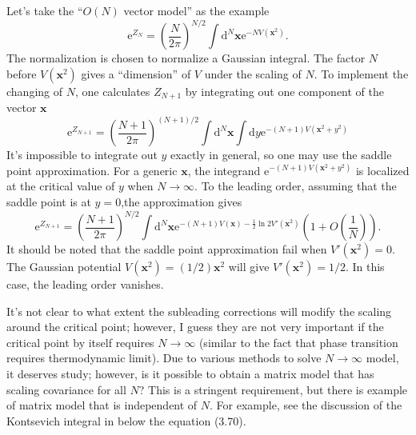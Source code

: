 Let's take the ``$O(N)$ vector model'' as the example
\begin{equation}
	\mathrm{e}^{Z_N} = \left(\frac{N}{2\pi}\right)^{N / 2} \int \mathrm{d}^N \mathbf{x} \mathrm{e}^{-N V(\mathbf{x}^2)}
.\end{equation}
The normalization is chosen to normalize a Gaussian integral.
The factor $N$ before $V(\mathbf{x}^2)$ gives a ``dimension'' of $V$ under the scaling of $N$.
To implement the changing of $N$, one calculates $Z_{N+1}$ by integrating out one component of the vector $\mathbf{x}$
\begin{equation}
	\mathrm{e}^{Z_{N+1}} = \left(\frac{N+1}{2\pi}\right)^{(N+1)/2} \int \mathrm{d}^N \mathbf{x} \int \mathrm{d} y \mathrm{e}^{-(N+1) V(\mathbf{x}^2 + y^2)}
\end{equation}
It's impossible to integrate out $y$ exactly in general,
so one may use the saddle point approximation.
For a generic $\mathbf{x}$, the integrand $\mathrm{e}^{-(N+1)V(\mathbf{x}^2 + y^2)}$ is localized at the critical value of $y$ when $N\to\infty$.
To the leading order, assuming that the saddle point is at $y=0$,the approximation gives \[
	\mathrm{e}^{Z_{N+1}} = \left(\frac{N+1}{2\pi}\right)^{N / 2} \int \mathrm{d}^N \mathbf{x} \mathrm{e}^{-(N+1)V(\mathbf{x}) - \frac{1}{2} \ln 2 V'(\mathbf{x}^2)} \left(1 + O(\frac{1}{N})\right)
.\] 
It should be noted that the saddle point approximation fail when $V'(\mathbf{x}^2) = 0$.
The Gaussian potential $V(\mathbf{x}^2) = (1 /2) \mathbf{x}^2$ will give $ V'(\mathbf{x}^2) = 1 /2$.
In this case, the leading order vanishes.

It's not clear to what extent the subleading corrections will modify the scaling around the critical point;
however, I guess they are not very important if the critical point by itself requires $N\to\infty$
(similar to the fact that phase transition requires thermodynamic limit).
Due to various methods to solve $N\to\infty$ model, it deserves study;
however, is it possible to obtain a matrix model that has scaling covariance for all $N$?
This is a stringent requirement,
but there is example of matrix model that is independent of $N$.
For example, see the discussion of the Kontsevich integral in
below the equation (3.70).

